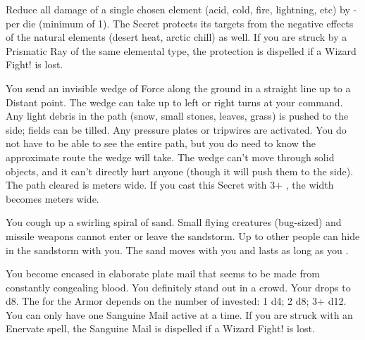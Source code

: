 Reduce all damage of a single chosen element (acid, cold, fire, lightning, etc) by -\DICE per die (minimum of 1).  The Secret protects its targets from the negative effects of the natural elements (desert heat, arctic chill) as well.  If you are struck by a Prismatic Ray of the same elemental type, the protection is dispelled if a Wizard Fight! is lost.




\WIZARDRY[
  Name=Rhea's Efficacious Plow,
  Link=secrets-rheas-efficacious-plow,
  Alignment=Force,
  Save=N,
  Duration=Moments,
  Counter=None ,
  Keywords=None,
  Target=See description
]

You send an invisible wedge of Force along the ground in a straight line up to a Distant point. The wedge can take up to \DICE left or right turns at your command. Any light debris in the path (snow, small stones, leaves, grass) is pushed to the side; fields can be tilled. Any pressure plates or tripwires are activated. You do not have to be able to see the entire path, but you do need to know the approximate route the wedge will take. The wedge can't move through solid objects, and it can't directly hurt anyone (though it will push them to the side). The path cleared is \DICE meters wide. If you cast this Secret with 3+ \DICE, the width becomes \SUMDICE meters wide.

\WIZARDRY[
  Name=Sandstorm,
  Link=secrets-sandstorm,
  Alignment=Elements,
  Save=N,
  Duration=Concentration,
  Counter=None ,
  Keywords=None,
  Target=Close
]

You cough up a swirling spiral of sand.  Small flying creatures (bug-sized) and missile weapons cannot enter or leave the sandstorm.  Up to  other
people can hide in the sandstorm with you.  The sand moves with you and lasts as long as you .



\WIZARDRY[
  Name=Sanguine Mail,
  Link=secrets-sanguine-mail,
  Alignment=Biomancy,
  Save=N,
  Duration=Session or until Exhausted,
  Counter=\mylink{Enervate}{secrets-enervate} ,
  Keywords=None,
  Target=Self
]


You become encased in elaborate plate mail that seems to be made from constantly congealing blood.  You definitely stand out in a crowd. Your \MD drops to d8.  The \UD for the Armor depends on the number of \DICE invested: 1 d4; 2 d8; 3+ d12. You can only have one Sanguine Mail active at a time. If you are struck with an Enervate spell, the Sanguine Mail is dispelled if a Wizard Fight! is lost.


